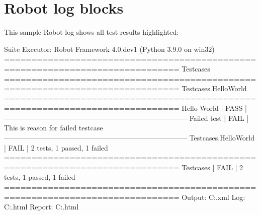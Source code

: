 %
%
%
\chapter{Robot log blocks}

This sample Robot log shows all test results highlighted:

\begin{robotlog}[caption=Robot log example,
                 label=label2,
                 linebackgroundcolor=\hllog{7,9}]
Suite Executor: Robot Framework 4.0.dev1 (Python 3.9.0 on win32)
==============================================================================
Testcases
==============================================================================
Testcases.HelloWorld
==============================================================================
Hello World                                                           | PASS |
------------------------------------------------------------------------------
Failed test                                                           | FAIL |
This is reason for failed testcase
------------------------------------------------------------------------------
Testcases.HelloWorld                                                  | FAIL |
2 tests, 1 passed, 1 failed
==============================================================================
Testcases                                                             | FAIL |
2 tests, 1 passed, 1 failed
==============================================================================
Output:  C:\RobotTest\testcases\output.xml
Log:     C:\RobotTest\testcases\log.html
Report:  C:\RobotTest\testcases\report.html
\end{robotlog}
